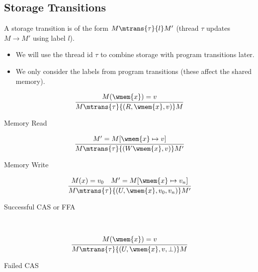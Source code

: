 \subsection{Storage Transitions}
A storage transition is of the form $M \mtrans{\tau}{l} M'$ (thread $\tau$ updates $M \to M'$ using label $l$).
\begin{itemize}
	\item We will use the thread id $\tau$ to combine storage with program transitions later.
	\item We only consider the labels from program transitions (these affect the shared memory).
\end{itemize}
\begin{minipage}{.33\textwidth}
	\[\cfrac{
			M(\wmem{x}) = v
		}{
			M \mtrans{\tau}{(R, \wmem{x}, v)} M
		}\]
	\centerline{Memory Read}
\end{minipage}
\begin{minipage}{.33\textwidth}
	\[\cfrac{
			M' = M[\wmem{x} \mapsto v]
		}{
			M \mtrans{\tau}{(W \wmem{x}, v)} M'
		}\]
	\centerline{Memory Write}
\end{minipage}
\begin{minipage}{.33\textwidth}
	\[\cfrac{
			M(x) = v_0 \quad M' = M[\wmem{x} \mapsto v_n]
		}{
			M \mtrans{\tau}{(U, \wmem{x}, v_0, v_n)} M'
		}\]
	\centerline{Successful CAS or FFA}
\end{minipage}
\vspace{5mm}
\\ \begin{minipage}{.33\textwidth}
	\[\cfrac{
			M(\wmem{x}) = v
		}{
			M \mtrans{\tau}{(U, \wmem{x}, v, \bot)} M
		}\]
	\centerline{Failed CAS}
\end{minipage}

